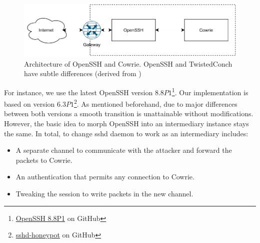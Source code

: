 \begin{figure}[ht]
    \centering
    \includegraphics{figures/sshd-honeypot.pdf}
    \caption[Architecture of OpenSSH and Cowrie]{Architecture of OpenSSH and Cowrie. OpenSSH and TwistedConch have subtle differences (derived from \cite{vetterl2020})}
    \label{fig:cowrie-fix}
\end{figure}

For instance, we use the latest OpenSSH version $8.8P1$\footnote{\href{https://github.com/openssh/openssh-portable/commit/bf944e3794eff5413f2df1ef37cddf96918c6bde}{OpenSSH 8.8P1} on GitHub}.
Our implementation is based on \citet{vetterl2020} version $6.3P1$\footnote{\href{https://github.com/amv42/sshd-honeypot/commit/f58830161002baec9d3ed218e78ddb06b0d40a23}{sshd-honeypot} on GitHub}.
As mentioned beforehand, due to major differences between both versions a smooth transition is unattainable without modifications.
However, the basic idea to morph OpenSSH into an intermediary instance stays the same.
In total, to change sshd daemon to work as an intermediary includes:

\begin{itemize}
    \item A separate channel to communicate with the attacker and forward the packets to Cowrie.
    \item An authentication that permits any connection to Cowrie.
    \item Tweaking the session to write packets in the new channel.
\end{itemize}


